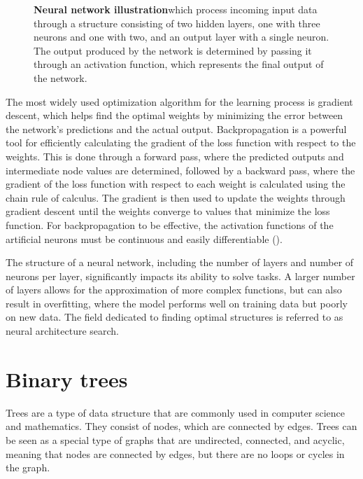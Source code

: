 \begin{figure}[!ht]
\centering
{}
\caption[Neural network representation]{
  \textbf{Neural network illustration}which process incoming input data through a structure consisting of two hidden layers, one with three neurons and one with two, and an output layer with a single neuron. The output produced by the network is determined by passing it through an activation function, which represents the final output of the network.
  }
\label{fig:neural_network}
\end{figure}


The most widely used optimization algorithm for the learning process is gradient descent, which helps find the optimal weights by minimizing the error between the network's predictions and the actual output. Backpropagation is a powerful tool for efficiently calculating the gradient of the loss function with respect to the weights. This is done through a forward pass, where the predicted outputs and intermediate node values are determined, followed by a backward pass, where the gradient of the loss function with respect to each weight is calculated using the chain rule of calculus. The gradient is then used to update the weights through gradient descent until the weights converge to values that minimize the loss function. For backpropagation to be effective, the activation functions of the artificial neurons must be continuous and easily differentiable (\cite{goodfellow_deep_2016}).

The structure of a neural network, including the number of layers and number of neurons per layer, significantly impacts its ability to solve tasks. A larger number of layers allows for the approximation of more complex functions, but can also result in overfitting, where the model performs well on training data but poorly on new data. The field dedicated to finding optimal structures is referred to as neural architecture search.

\section{Binary trees}

Trees are a type of data structure that are commonly used in computer science and mathematics. They consist of nodes, which are connected by edges. Trees can be seen as a special type of graphs that are undirected, connected, and acyclic, meaning that nodes are connected by edges, but there are no loops or cycles in the graph.


